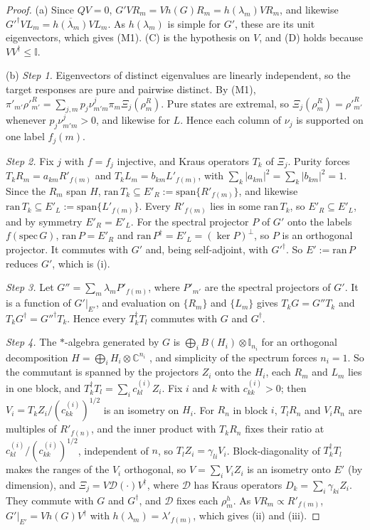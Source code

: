 \documentclass[11pt]{article}
\theoremstyle{definition}
\theoremstyle{remark}
\newcommand{\one}{\mathbb{I}}
\begin{document}
\begin{proof}
(a) Since $QV=0$, $G'VR_m=Vh(G)R_m=h(\lambda_m)VR_m$, and likewise $G'^\dagger VL_m=\overline{h(\lambda_m)}VL_m$. As $h(\lambda_m)$ is simple for $G'$, these are its unit eigenvectors, which gives (M1). (C) is the hypothesis on $V$, and (D) holds because $VV^\dagger\le\one$.

(b) \emph{Step 1.} Eigenvectors of distinct eigenvalues are linearly independent, so the target responses are pure and pairwise distinct. By (M1), $\pi'_{m'}\rho'^R_{m'}=\sum_{j,m}p_j\nu^j_{m'm}\pi_m\Xi_j(\rho^R_m)$. Pure states are extremal, so $\Xi_j(\rho^R_m)=\rho'^R_{m'}$ whenever $p_j\nu^j_{m'm}>0$, and likewise for $L$. Hence each column of $\nu_j$ is supported on one label $f_j(m)$.

\emph{Step 2.} Fix $j$ with $f=f_j$ injective, and Kraus operators $T_k$ of $\Xi_j$. Purity forces $T_kR_m=a_{km}R'_{f(m)}$ and $T_kL_m=b_{km}L'_{f(m)}$, with $\sum_k|a_{km}|^2=\sum_k|b_{km}|^2=1$. Since the $R_m$ span $H$, $\mathrm{ran}\,T_k\subseteq E'_R:=\mathrm{span}\{R'_{f(m)}\}$, and likewise $\mathrm{ran}\,T_k\subseteq E'_L:=\mathrm{span}\{L'_{f(m)}\}$. Every $R'_{f(m)}$ lies in some $\mathrm{ran}\,T_k$, so $E'_R\subseteq E'_L$, and by symmetry $E'_R=E'_L$. For the spectral projector $P$ of $G'$ onto the labels $f(\mathrm{spec}\,G)$, $\mathrm{ran}\,P=E'_R$ and $\mathrm{ran}\,P^\dagger=E'_L=(\ker P)^\perp$, so $P$ is an orthogonal projector. It commutes with $G'$ and, being self-adjoint, with $G'^\dagger$. So $E':=\mathrm{ran}\,P$ reduces $G'$, which is (i).

\emph{Step 3.} Let $G''=\sum_m\lambda_mP'_{f(m)}$, where $P'_{m'}$ are the spectral projectors of $G'$. It is a function of $G'|_{E'}$, and evaluation on $\{R_m\}$ and $\{L_m\}$ gives $T_kG=G''T_k$ and $T_kG^\dagger=G''^\dagger T_k$. Hence every $T_k^\dagger T_l$ commutes with $G$ and $G^\dagger$.

\emph{Step 4.} The $*$-algebra generated by $G$ is $\bigoplus_iB(H_i)\otimes\one_{n_i}$ for an orthogonal decomposition $H=\bigoplus_iH_i\otimes\mathbb C^{n_i}$ \cite{Dav96}, and simplicity of the spectrum forces $n_i=1$. So the commutant is spanned by the projectors $Z_i$ onto the $H_i$, each $R_m$ and $L_m$ lies in one block, and $T_k^\dagger T_l=\sum_ic^{(i)}_{kl}Z_i$. Fix $i$ and $k$ with $c^{(i)}_{kk}>0$; then $V_i=T_kZ_i/(c^{(i)}_{kk})^{1/2}$ is an isometry on $H_i$. For $R_n$ in block $i$, $T_lR_n$ and $V_iR_n$ are multiples of $R'_{f(n)}$, and the inner product with $T_kR_n$ fixes their ratio at $c^{(i)}_{kl}/(c^{(i)}_{kk})^{1/2}$, independent of $n$, so $T_lZ_i=\gamma_{li}V_i$. Block-diagonality of $T_k^\dagger T_l$ makes the ranges of the $V_i$ orthogonal, so $V=\sum_iV_iZ_i$ is an isometry onto $E'$ (by dimension), and $\Xi_j=V\mathcal D(\cdot)V^\dagger$, where $\mathcal D$ has Kraus operators $D_k=\sum_i\gamma_{ki}Z_i$. They commute with $G$ and $G^\dagger$, and $\mathcal D$ fixes each $\rho^h_m$. As $VR_m\propto R'_{f(m)}$, $G'|_{E'}=Vh(G)V^\dagger$ with $h(\lambda_m)=\lambda'_{f(m)}$, which gives (ii) and (iii).


\end{proof}
\end{document}
